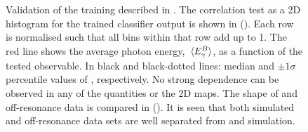 \begin{figure}[hbtp!]
    \centering
    \caption{\label{fig:bdt_validation} 
    Validation of the training described in .
    The correlation test as a 2D histogram for the trained classifier output is shown in ().
    Each row is normalised such that all bins within that row add up to 1.
    The red line shows  the average photon energy, $\expval**{{E^B_{\gamma}}}$, as a function of the tested observable.
    In black and black-dotted lines: median and $\pm 1 \sigma$ percentile values of \EB, respectively.
    No strong dependence can be observed in any of the quantities or the 2D maps.
    The shape of \mbox{\epem\ra\qqbar} and off-resonance data is compared in ().
    It is seen that both simulated and off-resonance data sets are well separated from \BB and \BtoXsgamma simulation.
    }
\end{figure}